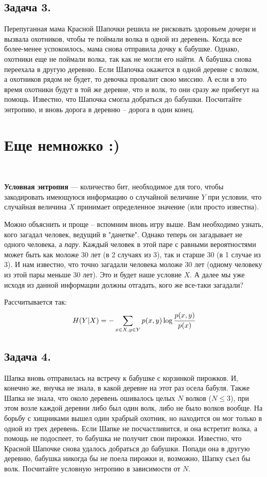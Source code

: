 \subsection*{Задача 3.} Перепуганная мама Красной Шапочки решила не рисковать здоровьем дочери и вызвала охотников, чтобы те поймали волка в одной из деревень. Когда все более-менее успокоилось, мама снова отправила дочку к бабушке. Однако, охотники еще не поймали волка, так как не могли его найти. А бабушка снова переехала в другую деревню. Если Шапочка окажется в одной деревне с волком, а охотников рядом не будет, то девочка провалит свою миссию. А если в это время охотники будут в той же деревне, что и волк, то они сразу же прибегут на помощь. Известно, что Шапочка смогла добраться до бабушки. Посчитайте энтропию, и вновь дорога в деревню -- дорога в один конец.

\section*{Еще немножко :)}~\
\\

\begin{siderules}
    \textbf{Условная энтропия} --- количество бит, необходимое для того, чтобы закодировать имеющуюся информацию о случайной величине $Y$ при условии, что случайная величина $X$ принимает определенное значение (или просто известна).
\end{siderules}

Можно объяснить и проще -- вспомним вновь игру выше. Вам необходимо узнать, кого загадал человек, ведущий в "данетке". Однако теперь он загадывает не одного человека, а \textit{пару}. Каждый человек в этой паре с равными вероятностями может быть как моложе 30 лет (в 2 случаях из 3), так и старше 30 (в 1 случае из 3). И нам известно, что точно загадали человека моложе 30 лет (одному человеку из этой пары меньше 30 лет). Это и будет наше условие $X$. А далее мы уже исходя из данной информации должны отгадать, кого же все-таки загадали?

Рассчитывается так:
\[H(Y|X)=-\sum\limits_{x\in X, y\in Y} p(x, y)\log \cfrac{p(x, y)}{p(x)} \]

\subsection*{Задача 4.} Шапка вновь отправилась на встречу к бабушке с корзинкой пирожков. И, конечно же, внучка не знала, в какой деревне на этот раз осела бабуля. Также Шапка не знала, что около деревень ошивалось целых $N$ волков ($N\leqslant3$), при этом возле каждой деревни либо был один волк, либо не было волков вообще. На борьбу с хищниками вышел один храбрый охотник, но находится он мог только в одной из трех деревень. Если Шапке не посчастливится, и она встретит волка, а помощь не подоспеет, то бабушка не получит свои пирожки. Известно, что Красной Шапочке снова удалось добраться до бабушки. Попади она в другую деревню, бабушка никогда бы не поела пирожки и, возможно, Шапку съел бы волк. Посчитайте условную энтропию в зависимости от $N$. 
\\

